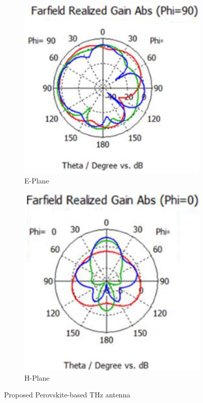 \documentclass[12pt]{suhbook}
\begin{document}
\begin{figure}[hbt!]
\begin{subfigure}{.45\textwidth}
\centering
\includegraphics[width=0.9\linewidth]{20}
\caption{E-Plane}
\label{fig:sfig15a}
\end{subfigure}%
\begin{subfigure}{.45\textwidth}
  \centering
  \includegraphics[width=0.9\linewidth]{21}
  \caption{H-Plane}
  \label{fig:sfigb15}
\end{subfigure}
\caption{Proposed Perovskite-based THz antenna}
\label{fig:fig 15}
\end{figure}
\end{document}
